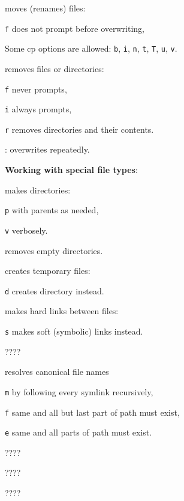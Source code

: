\begin{compactenum}
	\item [\symbolcoreutils]  moves (renames) files:
	\item [\texttt{f}] does not prompt before overwriting,
	\item [] Some cp options are allowed: \texttt{b}, \texttt{i}, \texttt{n}, \texttt{t}, \texttt{T}, \texttt{u}, \texttt{v}.

	\item [\symbolcoreutils]  removes files or directories:
	\item [\texttt{f}] never prompts,
	\item [\texttt{i}] always prompts,
	\item [\texttt{r}] removes directories and their contents.

	\item [\symbolcoreutils] : overwrites repeatedly.
\end{compactenum}

\textbf{Working with special file types}:
\begin{compactenum}
	\item [\symbolcoreutils]  makes directories:
	\item [\texttt{p}] with parents as needed,
	\item [\texttt{v}] verbosely.

	\item [\symbolcoreutils]  removes empty directories.

	\item [\symbolcoreutils]  creates temporary files:
	\item [\texttt{d}] creates directory instead.

	\item [\symbolcoreutils]  makes hard links between files:
	\item [\texttt{s}] makes soft (symbolic) links instead.

	\item [\symbolcoreutils]  \dotfill ????

	\item [\symbolcoreutils]  resolves canonical file names
	\item [\texttt{m}] by following every symlink recursively,
	\item [\texttt{f}] same and all but last part of path must exist,
	\item [\texttt{e}] same and all parts of path must exist.
	
	\item [\symbolcoreutils]  \dotfill ????

	\item [\symbolcoreutils]  \dotfill ????

	\item [\symbolcoreutils]  \dotfill ????
\end{compactenum}

